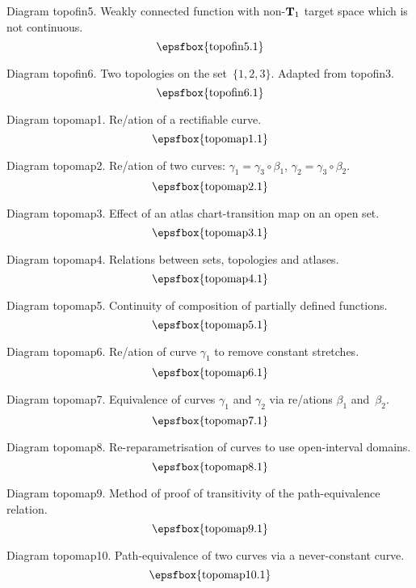 Diagram topofin5. Weakly connected function with non-${\bf T}_1$ target space which
is not continuous.
$$
\centerline{\epsfbox{topofin5.1}}
$$

Diagram topofin6. Two topologies on the set~$\{1,2,3\}$. Adapted from topofin3.
$$
\centerline{\epsfbox{topofin6.1}}
$$


\secteject
\edef\SECTtopomap{\the\pageno}

Diagram topomap1. Re\parametris/ation of a rectifiable curve.
$$
\centerline{\epsfbox{topomap1.1}}
$$

Diagram topomap2. Re\parametris/ation of two curves:
$\gamma_1=\gamma_3\circ\beta_1$, $\gamma_2=\gamma_3\circ\beta_2$.
$$
\centerline{\epsfbox{topomap2.1}}
$$

Diagram topomap3. Effect of an atlas chart-transition map on an open set.
$$
\centerline{\epsfbox{topomap3.1}}
$$

Diagram topomap4. Relations between sets, topologies and atlases.
$$
\centerline{\epsfbox{topomap4.1}}
$$

\filleject

Diagram topomap5. Continuity of composition of partially defined functions.
$$
\centerline{\epsfbox{topomap5.1}}
$$

Diagram topomap6. Re\parametris/ation of curve $\gamma_1$ to remove constant
stretches.
$$
\centerline{\epsfbox{topomap6.1}}
$$

Diagram topomap7. Equivalence of curves $\gamma_1$ and $\gamma_2$ via
re\parametris/ations $\beta_1$ and~$\beta_2$.
$$
\centerline{\epsfbox{topomap7.1}}
$$

Diagram topomap8. Re-reparametrisation of curves to use open-interval domains.
$$
\centerline{\epsfbox{topomap8.1}}
$$

\filleject

Diagram topomap9. Method of proof of transitivity of the path-equivalence
relation.
$$
\centerline{\epsfbox{topomap9.1}}
$$

Diagram topomap10. Path-equivalence of two curves via a never-constant curve.
$$
\centerline{\epsfbox{topomap10.1}}
$$

\secteject
\edef\SECTtree{\the\pageno}


